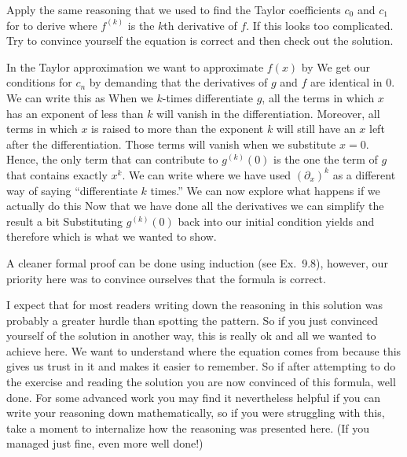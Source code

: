 \label{exGeneratingTaylorFormula}Apply the same reasoning that we used to find the Taylor coefficients $c_0$ and $c_1$ for to derive 
where $f^{(k)}$ is the $k$th derivative of $f$. If this looks too complicated. Try to convince yourself the equation is correct and then check out the solution.  

\solution
In the Taylor approximation we want to approximate $f(x)$ by 
We get our conditions for $c_n$ by demanding that the derivatives of $g$ and $f$ are identical in 0. We can write this as
When we $k$-times differentiate $g$, all the terms in which $x$ has an exponent of less than $k$ will vanish in the differentiation. Moreover, all terms in which $x$ is raised to more than the exponent $k$ will still have an $x$ left after the differentiation. Those terms will vanish when we substitute $x=0$. Hence, the only term that can contribute to $g^{(k)}(0)$ is the one the term of $g$ that contains exactly $x^k$. We can write 
where we have used $(\partial_x)^k$ as a different way of saying ``differentiate $k$ times.'' We can now explore what happens if we actually do this 
Now that we have done all the derivatives we can simplify the result a bit
Substituting $g^{(k)}(0)$ back into our initial condition yields
and therefore 
which is what we wanted to show. 

A cleaner formal proof can be done using induction (see Ex.~9.8), however, our priority here was to convince ourselves that the formula is correct.  

I expect that for most readers writing down the reasoning in this solution was probably a greater hurdle than spotting the pattern. So if you just convinced yourself of the solution in another way, this is really ok and all we wanted to achieve here. We want to understand where the equation comes from because this gives us trust in it and makes it easier to remember. So if after attempting to do the exercise and reading the solution you are now convinced of this formula, well done. For some advanced work you may find it nevertheless helpful if you can write your reasoning down mathematically, so if you were struggling with this, take a moment to internalize how the reasoning was presented here. (If you managed just fine, even more well done!) 
